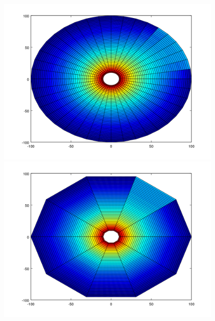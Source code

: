 \begin{figure}[H]
\centering
\begin{minipage}{0.30\textwidth}
  \centering
    \includegraphics[width=1\textwidth]{imgs/comp_angulos/comp_angs_temp0.png}
  \caption{}
  \label{fig:comp_angs_temp0}
\end{minipage}%
\hspace{0.03\textwidth}
\begin{minipage}{0.30\textwidth}   
  \centering
    \includegraphics[width=1\textwidth]{imgs/comp_angulos/comp_angs_temp3.png} 
  \caption{}
  \label{fig:comp_angs_temp3}
\end{minipage}%
\hspace{0.03\textwidth}
\begin{minipage}{0.30\textwidth}   

\end{minipage}
\end{figure}
